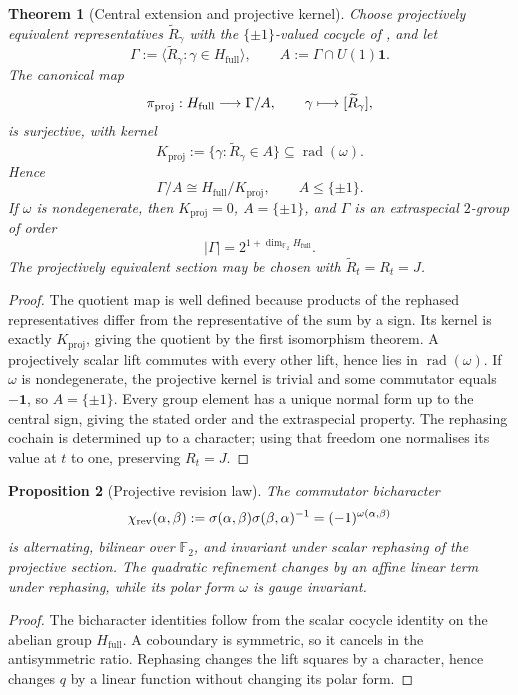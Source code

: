 \documentclass[11pt]{article}
\newtheorem{theorem}{Theorem}[section]
\newtheorem{proposition}[theorem]{Proposition}
\theoremstyle{definition}
\theoremstyle{remark}
\newcommand{\F}{\mathbb{F}}
\newcommand{\Hf}{H_{\mathrm{full}}}
\newcommand{\rad}{\operatorname{rad}}
\newcommand{\one}{\mathbf{1}}
\newcommand{\Kproj}{K_{\mathrm{proj}}}
\newcommand{\Grp}{\Gamma}
\begin{document}
\begin{theorem}[Central extension and projective kernel]
\label{thm:revision-central-extension-main}
Choose projectively equivalent representatives $\widetilde R_\gamma$ with the
$\{\pm1\}$-valued cocycle of
, and let
\[
  \Grp:=\langle\widetilde R_\gamma:\gamma\in\Hf\rangle,
  \qquad
  A:=\Grp\cap U(1)\one.
\]
The canonical map
\[
  \pi_{\rm proj}:\Hf\longrightarrow\Grp/A,
  \qquad \gamma\longmapsto[\widetilde R_\gamma],
\]
is surjective, with kernel
\[
  \Kproj:=\{\gamma:\widetilde R_\gamma\in A\}
  \subseteq\rad(\omega).
\]
Hence
\[
  \Grp/A\cong\Hf/\Kproj,
  \qquad A\le\{\pm1\}.
\]
If $\omega$ is nondegenerate, then $\Kproj=0$, $A=\{\pm1\}$, and $\Grp$ is an
extraspecial $2$-group of order
\[
  |\Grp|=2^{1+\dim_{\F_2}\Hf}.
\]
The projectively equivalent section may be chosen with
$\widetilde R_t=R_t=J$.
\end{theorem}

\begin{proof}
The quotient map is well defined because products of the rephased
representatives differ from the representative of the sum by a sign.  Its
kernel is exactly $\Kproj$, giving the quotient by the first isomorphism theorem.
A projectively scalar lift commutes with every other lift, hence lies in
$\rad(\omega)$.  If $\omega$ is nondegenerate, the projective kernel is trivial
and some commutator equals $-\one$, so $A=\{\pm1\}$.  Every group element has a
unique normal form up to the central sign, giving the stated order and the
extraspecial property.  The rephasing cochain is determined up to a character;
using that freedom one normalises its value at $t$ to one, preserving $R_t=J$.
\end{proof}

\begin{proposition}[Projective revision law]
\label{prop:projective-revision}
The commutator bicharacter
\[
  \chi_{\rm rev}(\alpha,\beta)
  :=\sigma(\alpha,\beta)\sigma(\beta,\alpha)^{-1}
  =(-1)^{\omega(\alpha,\beta)}
\]
is alternating, bilinear over $\F_2$, and invariant under scalar rephasing of
the projective section.  The quadratic refinement changes by an affine linear
term under rephasing, while its polar form $\omega$ is gauge invariant.
\end{proposition}

\begin{proof}
The bicharacter identities follow from the scalar cocycle identity on the
abelian group $\Hf$.  A coboundary is symmetric, so it cancels in the
antisymmetric ratio.  Rephasing changes the lift squares by a character, hence
changes $q$ by a linear function without changing its polar form.
\end{proof}
\end{document}
